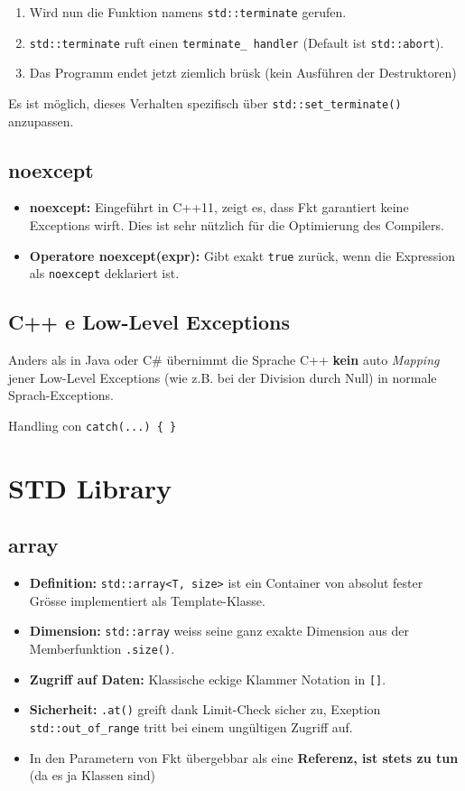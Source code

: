 \begin{enumerate}
    \item Wird nun die Funktion namens \texttt{std::terminate} gerufen.
    \item \texttt{std::terminate} ruft einen \texttt{terminate\_ handler} (Default ist \texttt{std::abort}).
    \item Das Programm endet jetzt ziemlich brüsk (kein Ausführen der Destruktoren)
\end{enumerate}\smallbreak

Es ist möglich, dieses Verhalten spezifisch über \texttt{std::set\_terminate()} anzupassen. 
\subsection{noexcept}
\begin{itemize}
    \item \textbf{noexcept:} Eingeführt in C++11, zeigt es, dass Fkt garantiert keine Exceptions wirft. Dies ist sehr nützlich für die Optimierung des Compilers.
    \item \textbf{Operatore noexcept(expr):} Gibt exakt \texttt{true} zurück, wenn die Expression als \texttt{noexcept} deklariert ist.
\end{itemize}

\vspace{-1em}

\subsection{C++ e Low-Level Exceptions}
Anders als in Java oder C\# übernimmt die Sprache C++ \textbf{kein} auto \textit{Mapping} jener Low-Level Exceptions (wie z.B. bei der Division durch Null) in normale Sprach-Exceptions. 
\smallskip

Handling con \texttt{catch(...) \{ \}} 

\section{STD Library}
\subsection{array}
\begin{itemize}
\item \textbf{Definition:} \texttt{std::array<T, size>} ist ein Container von absolut fester Grösse implementiert als Template-Klasse.
\item \textbf{Dimension:} \texttt{std::array} weiss seine ganz exakte Dimension aus der Memberfunktion \texttt{.size()}.
\item \textbf{Zugriff auf Daten:} Klassische eckige Klammer Notation in \texttt{[]}.
\item \textbf{Sicherheit:} \texttt{.at()} greift dank Limit-Check sicher zu, Exeption \lstinline|std::out_of_range| tritt bei einem ungültigen Zugriff auf.
\item In den Parametern von Fkt übergebbar als eine \textbf{\color{red}Referenz, ist stets zu tun} (da es ja Klassen sind)
\end{itemize}

